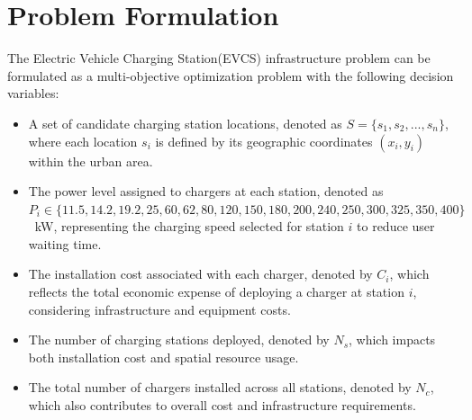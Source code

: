 \documentclass[12pt]{report}
\begin{document}
\section{Problem Formulation}
The Electric Vehicle Charging Station(EVCS) infrastructure problem can be formulated as a multi-objective optimization problem with the following decision variables:
\begin{itemize}
    \item A set of candidate charging station locations, denoted as $S = \{s_1, s_2, ..., s_n\}$, where each location $s_i$ is defined by its geographic coordinates $(x_i, y_i)$ within the urban area.

    \item  The power level assigned to chargers at each station, denoted as $P_i \in \{11.5, 14.2, 19.2, 25, 60, 62, 80, 120, 150, 180, 200, 240, 250, 300, 325, 350, 400\} $~kW, representing the charging speed selected for station $i$ to reduce user waiting time.

    \item The installation cost associated with each charger, denoted by $C_i$, which reflects the total economic expense of deploying a charger at station $i$, considering infrastructure and equipment costs.

    \item The number of charging stations deployed, denoted by $N_s$, which impacts both installation cost and spatial resource usage.

    \item The total number of chargers installed across all stations, denoted by $N_c$, which also contributes to overall cost and infrastructure requirements.
\end{itemize}
\end{document}
